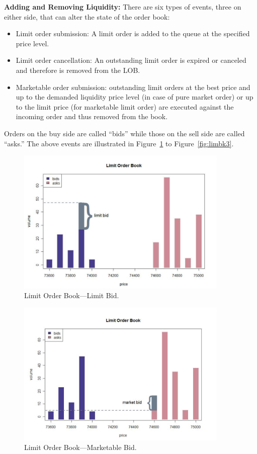 \textbf{Adding and Removing Liquidity:}
There are six types of events, three on either side, that can alter the state of the order book:
	\begin{itemize}
	\item Limit order submission: A limit order is added to the queue at the specified price level.
	\item Limit order cancellation: An outstanding limit order is expired or canceled and therefore is removed from the LOB.
	\item Marketable order submission: outstanding limit orders at the best price and up to the demanded liquidity price level (in case of pure market order) or up to the limit price (for marketable limit order) are executed against the incoming order and thus removed from the book.
	\end{itemize}


Orders on the buy side are called ``bids'' while those on the sell side are called ``asks.'' The above events are illustrated in Figure~\ref{fig:limbk1} to Figure~\ref{fig:limbk3}. \\
	\begin{figure}[!ht]
	   \centering
	   \includegraphics[width=0.9\textwidth]{chapters/chapter_trading_fund/figures/limitbk1.png} 
	   \caption{Limit Order Book---Limit Bid. \label{fig:limbk1}}
	\end{figure}
	\begin{figure}[!ht]
	   \centering
	   \includegraphics[width=0.9\textwidth]{chapters/chapter_trading_fund/figures/limitbk2.png} 
	   \caption{Limit Order Book---Marketable Bid. \label{fig:limbk2}}
	\end{figure}
	
